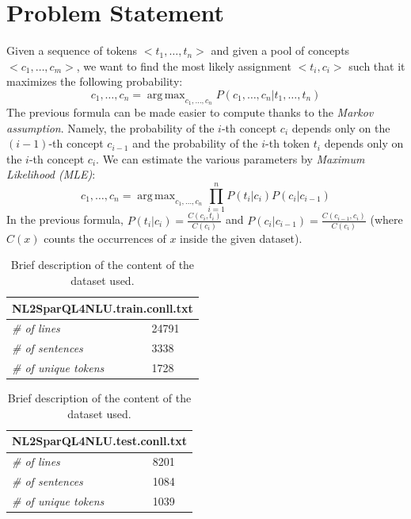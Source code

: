 \documentclass[11pt,a4paper]{article}
\DeclareMathOperator*{\argmax}{arg\,max}
\begin{document}
 

\section{Problem Statement}
Given a sequence of tokens $<t_1, \ldots, t_n>$ and given a pool of concepts $<c_1, \ldots, c_m>$, we want to find the most likely assignment $<t_i, c_i>$ such that it maximizes the following probability:
\begin{equation}
c_1, \ldots, c_n = \argmax_{c_1, \ldots, c_n} P (c_1, \ldots, c_n | t_1, \ldots, t_n)
\label{frm:argmax}
\end{equation}
The previous formula can be made easier to compute thanks to the \textit{Markov assumption}. Namely, the probability of the $i$-th concept $c_i$ depends only on the $(i-1)$-th concept $c_{i-1}$ and the probability of the $i$-th token $t_i$ depends only on the $i$-th concept $c_i$. We can estimate the various parameters by \textit{Maximum Likelihood (MLE)}:
\begin{equation}
c_1, \ldots, c_n = \argmax_{c_1, \ldots, c_n} \prod_{i=1}^n P(t_i|c_i)P(c_i| c_{i-1})
\label{frm:argmax-markov-assumption}
\end{equation}
In the previous formula, $P(t_i|c_i) = \frac{C(c_i, t_i)}{C(c_i)}$ and $P(c_i|c_{i-1}) = \frac{C(c_{i-1}, c_i)}{C(c_i)}$ (where $C(x)$ counts the occurrences of $x$ inside the given dataset). 

\begin{table}
    \begin{subtable}{.5\linewidth}
		\centering
\begin{tabular}{|l|l|}
\hline
\multicolumn{2}{|l|}{\textbf{NL2SparQL4NLU.train.conll.txt}} \\ \hline
\textit{\# of lines}									& 24791 \\ \hline
\textit{\# of sentences}                             & 3338 \\ \hline
\textit{\# of unique tokens}                         & 1728 \\ \hline
\end{tabular}
\caption{Train dataset.}
\end{subtable}%
\begin{subtable}{.5\linewidth}
\centering
\begin{tabular}{|l|l|}
\hline
\multicolumn{2}{|l|}{\textbf{NL2SparQL4NLU.test.conll.txt}} \\ \hline
\textit{\# of lines}									& 8201 \\ \hline
\textit{\# of sentences}                             & 1084 \\ \hline
\textit{\# of unique tokens}                         & 1039 \\ \hline
\end{tabular}
\caption{Test dataset.}
\end{subtable}
\caption{Brief description of the content of the dataset used.}
\label{tab:test-dataset-description}
\end{table} 
\end{document}
